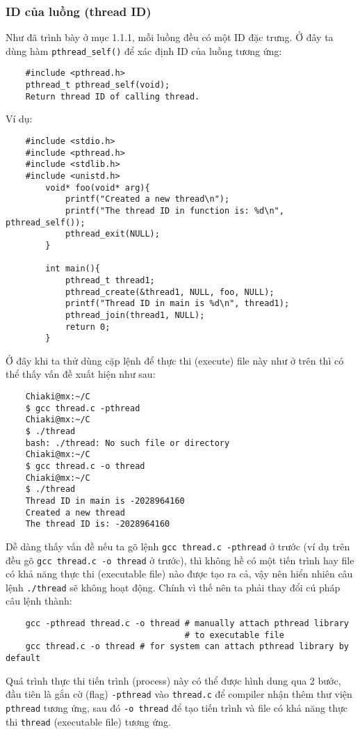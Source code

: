 \documentclass{article}
\begin{document}
\subsubsection{ID của luồng (thread ID)}
Như đã trình bày ở mục 1.1.1, mỗi luồng đều có một ID đặc trưng. Ở đây ta dùng hàm \verb|pthread_self()| để xác định ID
của luồng tương ứng:
\begin{verbatim}
    #include <pthread.h>
    pthread_t pthread_self(void);
    Return thread ID of calling thread.
\end{verbatim}
Ví dụ:
\begin{verbatim}
    #include <stdio.h>
    #include <pthread.h>
    #include <stdlib.h>
    #include <unistd.h>
        void* foo(void* arg){
            printf("Created a new thread\n");
            printf("The thread ID in function is: %d\n", pthread_self());
            pthread_exit(NULL);
        }
    
        int main(){
            pthread_t thread1;
            pthread_create(&thread1, NULL, foo, NULL);
            printf("Thread ID in main is %d\n", thread1);
            pthread_join(thread1, NULL);
            return 0;
        }    
\end{verbatim}
Ở đây khi ta thử dùng cặp lệnh để thực thi (execute) file này như ở trên thì có thể thấy vấn đề xuất hiện như sau:
\begin{verbatim}
    Chiaki@mx:~/C
    $ gcc thread.c -pthread
    Chiaki@mx:~/C
    $ ./thread
    bash: ./thread: No such file or directory
    Chiaki@mx:~/C
    $ gcc thread.c -o thread
    Chiaki@mx:~/C
    $ ./thread
    Thread ID in main is -2028964160
    Created a new thread
    The thread ID is: -2028964160
\end{verbatim}
Dễ dàng thấy vấn đề nếu ta gõ lệnh \verb|gcc thread.c -pthread| ở trước (ví dụ trên đều gõ \verb|gcc thread.c -o thread| ở trước), thì không hề có một 
tiến trình hay file có khả năng thực thi (executable file) nào được tạo ra cả, vậy nên hiển nhiên câu lệnh \verb|./thread| sẽ không hoạt động. Chính vì thế nên ta phải thay đổi cú pháp
câu lệnh thành:
\begin{verbatim}
    gcc -pthread thread.c -o thread # manually attach pthread library
                                    # to executable file
    gcc thread.c -o thread # for system can attach pthread library by default
\end{verbatim}
Quá trình thực thi tiến trình (process) này có thể được hình dung qua 2 bước, đầu tiên là gắn cờ (flag) \verb|-pthread| vào \verb|thread.c| để
compiler nhận thêm thư viện \verb|pthread| tương ứng, sau đó \verb|-o thread| để tạo tiến trình và file có khả năng thực thi \verb|thread| (executable file) tương ứng.
\end{document}
